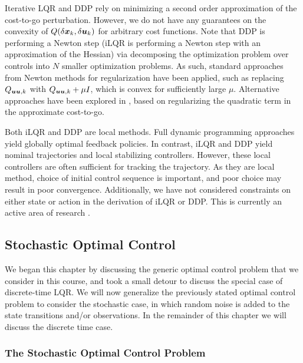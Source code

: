 Iterative LQR and DDP rely on minimizing a second order approximation of the cost-to-go perturbation. However, we do not have any guarantees on the convexity of $Q(\delta \bm{x}_k, \delta \bm{u}_k)$ for arbitrary cost functions. Note that DDP is performing a Newton step \cite{liao1992advantages} (iLQR is performing a Newton step with an approximation of the Hessian) via decomposing the optimization problem over controls into $N$ smaller optimization problems. As such, standard approaches from Newton methods for regularization have been applied, such as replacing $Q_{\bm{u}\bm{u},k}$ with $Q_{\bm{u}\bm{u},k} + \mu I$, which is convex for sufficiently large $\mu$. Alternative approaches have been explored in \cite{tassa2012synthesis,tassa2014control}, based on regularizing the quadratic term in the approximate cost-to-go. 

Both iLQR and DDP are local methods. Full dynamic programming approaches yield globally optimal feedback policies. In contrast, iLQR and DDP yield nominal trajectories and local stabilizing controllers. However, these local controllers are often sufficient for tracking the trajectory. As they are local method, choice of initial control sequence is important, and poor choice may result in poor convergence. Additionally, we have not considered constraints on either state or action in the derivation of iLQR or DDP. This is currently an active area of research \cite{xie2017differential, tassa2014control, giftthaler2017projection}.


\subsection{Stochastic Optimal Control}

We began this chapter by discussing the generic optimal control problem that we consider in this course, and took a small detour to discuss the special case of discrete-time LQR. We will now generalize the previously stated optimal control problem to consider the stochastic case, in which random noise is added to the state transitions and/or observations. In the remainder of this chapter we will discuss the discrete time case. 

\subsubsection{The Stochastic Optimal Control Problem}


